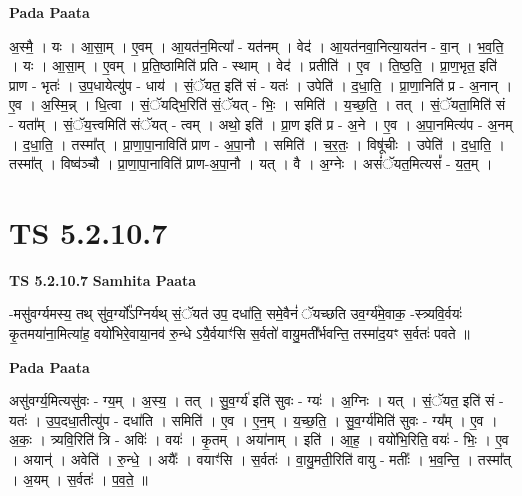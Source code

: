 \documentclass[17pt]{extarticle}
\begin{document}
\textbf{Pada Paata} \newline

अ॒स्मै॒ । यः । आ॒सा॒म् । ए॒वम् । आ॒यत॑न॒मित्या᳚ - यत॑नम् । वेद॑ । आ॒यत॑नवा॒नित्या॒यत॑न - वा॒न् । भ॒व॒ति॒ । यः । आ॒सा॒म् । ए॒वम् । प्र॒ति॒ष्ठामिति॑ प्रति - स्थाम् । वेद॑ । प्रतीति॑ । ए॒व । ति॒ष्ठ॒ति॒ । प्रा॒ण॒भृत॒ इति॑ प्राण - भृतः॑ । उ॒प॒धायेत्यु॑प - धाय॑ । सं॒ॅयत॒ इति॑ सं - यतः॑ । उपेति॑ । द॒धा॒ति॒ । प्रा॒णा॒निति॑ प्र - अ॒नान् । ए॒व । अ॒स्मि॒न्न् । धि॒त्वा । सं॒ॅयद्भि॒रिति॑ सं॒ॅयत् - भिः॒ । समिति॑ । य॒च्छ॒ति॒ । तत् । सं॒ॅयता॒मिति॑ सं - यता᳚म् । सं॒ॅय॒त्त्वमिति॑ संॅयत् - त्वम् । अथो॒ इति॑ । प्रा॒ण इति॑ प्र - अ॒ने । ए॒व । अ॒पा॒नमित्य॑प - अ॒नम् । द॒धा॒ति॒ । तस्मा᳚त् । प्रा॒णा॒पा॒नाविति॑ प्राण - अ॒पा॒नौ । समिति॑ । च॒र॒तः॒ । विषू॑चीः । उपेति॑ । द॒धा॒ति॒ । तस्मा᳚त् । विष्व॑ञ्चौ । प्रा॒णा॒पा॒नाविति॑ प्राण-अ॒पा॒नौ । यत् । वै । अ॒ग्नेः । असं॑ॅयत॒मित्यसं᳚ - य॒त॒म् ।  \newline




\section*{ TS 5.2.10.7 }

\textbf{TS 5.2.10.7 } \newline
\textbf{Samhita Paata} \newline

-मसु॑वर्ग्यमस्य॒ तथ् सु॑व॒र्ग्यो᳚ऽग्निर्यथ् सं॒ॅयत॑ उप॒ दधा॑ति॒ समे॒वैनं॑ ॅयच्छति उव॒र्ग्य॑मे॒वाक॒ -स्त्र्यवि॒र्वयः॑ कृ॒तमया॑ना॒मित्या॑ह॒ वयो॑भिरे॒वाया॒नव॑ रु॒न्धे ऽयै॒र्वयाꣳ॑सि स॒र्वतो॑ वायु॒मती᳚र्भवन्ति॒ तस्मा॑द॒यꣳ स॒र्वतः॑ पवते ॥ \newline

\textbf{Pada Paata} \newline

असु॑वर्ग्य॒मित्यसु॑वः - ग्य॒म् । अ॒स्य॒ । तत् । सु॒व॒र्ग्य॑ इति॑ सुवः - ग्यः॑ । अ॒ग्निः । यत् । सं॒ॅयत॒ इति॑ सं - यतः॑ । उ॒प॒दधा॒तीत्यु॑प - दधा॑ति । समिति॑ । ए॒व । ए॒न॒म् । य॒च्छ॒ति॒ । सु॒व॒र्ग्य॑मिति॑ सुवः - ग्य᳚म् । ए॒व । अ॒कः॒ । त्र्यवि॒रिति॑ त्रि - अविः॑ । वयः॑ । कृ॒तम् । अया॑नाम् । इति॑ । आ॒ह॒ । वयो॑भि॒रिति॒ वयः॑ - भिः॒ । ए॒व । अयान्॑ । अवेति॑ । रु॒न्धे॒ । अयैः᳚ । वयाꣳ॑सि । स॒र्वतः॑ । वा॒यु॒मती॒रिति॑ वायु - मतीः᳚ । भ॒व॒न्ति॒ । तस्मा᳚त् । अ॒यम् । स॒र्वतः॑ । प॒व॒ते॒ ॥  \newline




\end{document}
